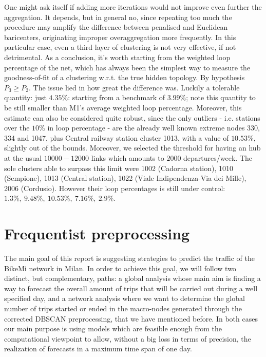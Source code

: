 \documentclass[11pt,twoside]{report}
\begin{document}
 One might ask itself if adding more iterations would not improve even further the aggregation. It depends, but in general no, since repeating too much the procedure may amplify the difference between penalised and Euclidean baricenters, originating improper overaggregation more frequently. In this particular case, even a third layer of clustering is not very effective, if not detrimental. As a conclusion, it's worth starting from the weighted loop percentage of the net, which has always been the simplest way to measure the goodness-of-fit of a clustering w.r.t. the true hidden topology. By hypothesis $ P_3\geq P_2 $. The issue lied in how great the difference was. Luckily a tolerable quantity: just $ 4.35\% $: starting from a benchmark of $ 3.99\% $; note this quantity to be still smaller than M1's average weighted loop percentage. Moreover, this estimate can also be considered quite robust, since the only outliers - i.e. stations over the $ 10\% $ in loop percentage - are the already well known extreme nodes 330, 334 and 1047, plus Central railway station cluster 1013, with a value of $ 10.53\% $, slightly out of the bounds. Moreover, we selected the threshold for having an hub at the usual $ 10000-12000 $ links which amounts to $ 2000 $ departures/week. The sole clusters able to surpass this limit were 1002 (Cadorna station), 1010 (Sempione), 1013 (Central station), 1022 (Viale Indipendenza-Via dei Mille), 2006 (Cordusio). However their loop percentages is still under control: $ 1.3\%,\ 9.48\%,\ 10.53\%,\ 7.16\%,\ 2.9\% $.


\chapter{Frequentist preprocessing}
The main goal of this report is suggesting strategies to predict the traffic of the BikeMi network in Milan. In order to achieve this goal, we will follow two distinct, but complementary, paths: a global analysis whose main aim is finding a way to forecast the overall amount of trips that will be carried out during a well specified day, and a network analysis where we want to determine the global number of trips started or ended in the macro-nodes generated through the corrected DBSCAN preprocessing, that we have mentioned before. In both cases our main purpose is using models which are feasible enough from the computational viewpoint to allow, without a big loss in terms of precision, the realization of forecasts in a maximum time span of one day.
\end{document}
